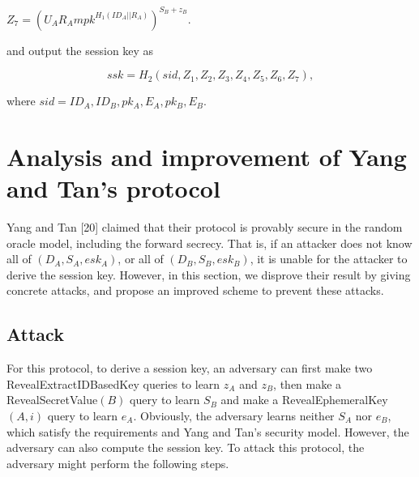 \documentclass[final,1p,times,twocolumn]{elsarticle}
\begin{document}
$Z_{7}=(U_{A}R_{A}mpk^{H_{1}(ID_{A}||R_{A})})^{S_{B}+z_{B}}$.

\vspace{0.1cm}

and output the session key as

\vspace{0.1cm}

$$ssk=H_{2}(sid,Z_{1},Z_{2},Z_{3},Z_{4},Z_{5},Z_{6},Z_{7}),$$

\vspace{0.1cm}

where $sid=ID_{A},ID_{B},pk_{A},E_{A},pk_{B},E_{B}$.

\vspace{0.3cm}




\section{Analysis and improvement of Yang and Tan's protocol}
\label{4}

Yang and Tan [20] claimed that their protocol is provably secure in the random oracle model, including the forward secrecy. That is, if an attacker does not know all of $(D_{A},S_{A},esk_{A})$, or all of $(D_{B},S_{B},esk_{B})$, it is unable for the attacker to derive the session key. However, in this section, we disprove their result by giving concrete attacks, and propose an improved scheme to prevent these attacks.

\vspace{0.2cm}

\subsection{Attack}
\label{4.1}

\vspace{0.1cm}

For this protocol, to derive a session key, an adversary can first make two RevealExtractIDBasedKey queries to learn $z_{A}$ and $z_{B}$, then make a RevealSecretValue$(B)$ query to learn $S_{B}$ and make a RevealEphemeralKey$(A,i)$ query to learn $e_{A}$. Obviously, the adversary learns neither  $S_{A}$ nor $e_{B}$, which satisfy the requirements and Yang and Tan's security model. However, the adversary can also compute the session key. To attack this protocol, the adversary might perform the following steps.

\vspace{0.1cm}
\end{document}
